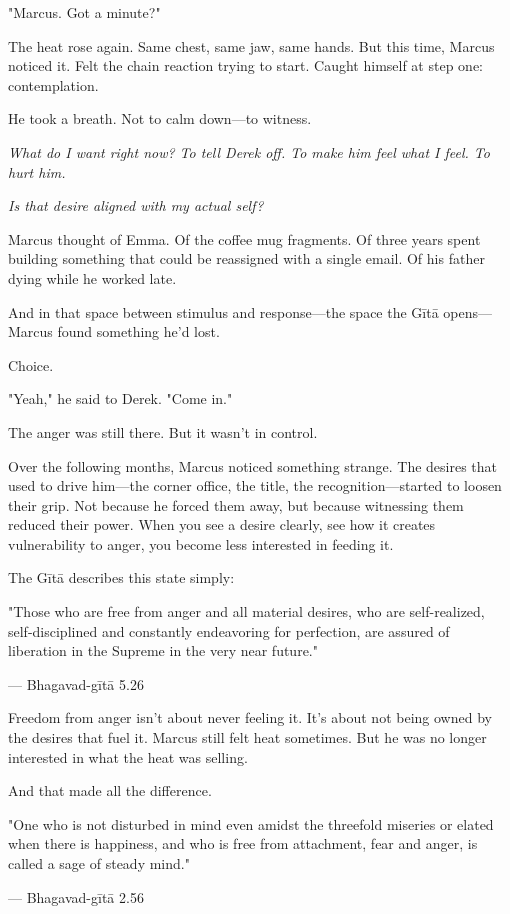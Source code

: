 \documentclass[11pt,twoside]{book}
\begin{document}
"Marcus. Got a minute?"

The heat rose again. Same chest, same jaw, same hands. But this time, Marcus noticed it. Felt the chain reaction trying to start. Caught himself at step one: contemplation.

He took a breath. Not to calm down—to witness.

\textit{What do I want right now? To tell Derek off. To make him feel what I feel. To hurt him.}

\textit{Is that desire aligned with my actual self?}

Marcus thought of Emma. Of the coffee mug fragments. Of three years spent building something that could be reassigned with a single email. Of his father dying while he worked late.

And in that space between stimulus and response—the space the Gītā opens—Marcus found something he'd lost.

Choice.

"Yeah," he said to Derek. "Come in."

The anger was still there. But it wasn't in control.

Over the following months, Marcus noticed something strange. The desires that used to drive him—the corner office, the title, the recognition—started to loosen their grip. Not because he forced them away, but because witnessing them reduced their power. When you see a desire clearly, see how it creates vulnerability to anger, you become less interested in feeding it.

The Gītā describes this state simply:

\begin{pullquote}
"Those who are free from anger and all material desires, who are self-realized, self-disciplined and constantly endeavoring for perfection, are assured of liberation in the Supreme in the very near future."

--- Bhagavad-gītā 5.26
\end{pullquote}

Freedom from anger isn't about never feeling it. It's about not being owned by the desires that fuel it. Marcus still felt heat sometimes. But he was no longer interested in what the heat was selling.

And that made all the difference.

\begin{pullquote}
"One who is not disturbed in mind even amidst the threefold miseries or elated when there is happiness, and who is free from attachment, fear and anger, is called a sage of steady mind."

--- Bhagavad-gītā 2.56
\end{pullquote}
\end{document}
